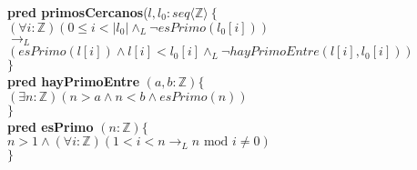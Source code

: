 \documentclass[a4paper]{article}
\begin{document}
			\textbf{pred primosCercanos}($l,l_0: seq\langle\mathbb{Z}\rangle
			\ \{$\smallskip \\
			\hspace*{6mm}$(\forall i:\mathbb{Z})(0\leq i<|l_0|\wedge_L\neg esPrimo(l_0[i]))$\\
			\hspace*{6mm}$\rightarrow_L$ \\
			\hspace*{6mm}$(esPrimo(l[i]) \wedge 
				l[i]<l_0[i]\wedge_L \neg hayPrimoEntre(l[i],l_0[i]))$\\
			\hspace*{5mm}$\}$\smallskip \\
			
			\textbf{pred hayPrimoEntre} $(a,b: \mathbb{Z})\{$\\ 
			\hspace*{6mm}$(\exists n:\mathbb{Z})(n>a\wedge
			n<b\wedge esPrimo(n))$\\
			\hspace*{5mm}$\}$\smallskip \\
			
			\textbf{pred esPrimo} $(n: \mathbb{Z})\{$\\ 
			\hspace*{6mm}$ n > 1 \wedge(\forall i :\mathbb{Z})
			(1<i<n \rightarrow _L n\textrm{ mod }i\neq 0 )$\\
			\hspace*{5mm}$\}$\smallskip \\
\end{document}
